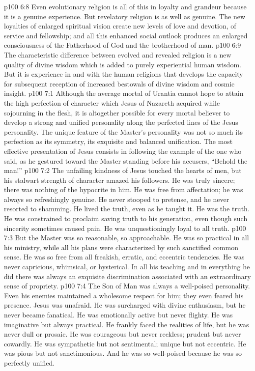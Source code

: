 \pc \vs p100 6:8 Even evolutionary religion is all of this in loyalty and grandeur because it is a genuine experience. But revelatory religion is  as well as genuine. The new loyalties of enlarged spiritual vision create new levels of love and devotion, of service and fellowship; and all this enhanced social outlook produces an enlarged consciousness of the Fatherhood of God and the brotherhood of man.
\vs p100 6:9 The characteristic difference between evolved and revealed religion is a new quality of divine wisdom which is added to purely experiential human wisdom. But it is experience in and with the human religions that develops the capacity for subsequent reception of increased bestowals of divine wisdom and cosmic insight.
\vs p100 7:1 Although the average mortal of Urantia cannot hope to attain the high perfection of character which Jesus of Nazareth acquired while sojourning in the flesh, it is altogether possible for every mortal believer to develop a strong and unified personality along the perfected lines of the Jesus personality. The unique feature of the Master’s personality was not so much its perfection as its symmetry, its exquisite and balanced unification. The most effective presentation of Jesus consists in following the example of the one who said, as he gestured toward the Master standing before his accusers, “Behold the man!”
\vs p100 7:2 The unfailing kindness of Jesus touched the hearts of men, but his stalwart strength of character amazed his followers. He was truly sincere; there was nothing of the hypocrite in him. He was free from affectation; he was always so refreshingly genuine. He never stooped to pretense, and he never resorted to shamming. He lived the truth, even as he taught it. He was the truth. He was constrained to proclaim saving truth to his generation, even though such sincerity sometimes caused pain. He was unquestioningly loyal to all truth.
\vs p100 7:3 But the Master was so reasonable, so approachable. He was so practical in all his ministry, while all his plans were characterized by such sanctified common sense. He was so free from all freakish, erratic, and eccentric tendencies. He was never capricious, whimsical, or hysterical. In all his teaching and in everything he did there was always an exquisite discrimination associated with an extraordinary sense of propriety.
\vs p100 7:4 The Son of Man was always a well\hyp{}poised personality. Even his enemies maintained a wholesome respect for him; they even feared his presence. Jesus was unafraid. He was surcharged with divine enthusiasm, but he never became fanatical. He was emotionally active but never flighty. He was imaginative but always practical. He frankly faced the realities of life, but he was never dull or prosaic. He was courageous but never reckless; prudent but never cowardly. He was sympathetic but not sentimental; unique but not eccentric. He was pious but not sanctimonious. And he was so well\hyp{}poised because he was so perfectly unified.
